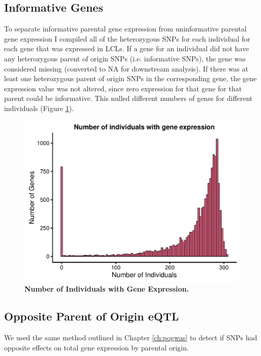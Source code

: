 \subsection{Informative Genes}\label{Informative Genes}
To separate informative parental gene expression from uninformative parental gene expression I compiled all of the heterozygous SNPs for each individual for each gene that was expressed in LCLs. If a gene for an individual did not have any heterozygous parent of origin SNPs (i.e. informative SNPs), the gene was considered missing (converted to NA for downstream analysis). If there was at least one heterozygous parent of origin SNPs in the corresponding gene, the gene expression value was not altered, since zero expression for that gene for that parent could be informative. This nulled different numbers of genes for different individuals (Figure \ref{fig:indspergene}).

\begin{figure}[!htb]
\centering \includegraphics[width=5in]{img/ch04/fig-08-individualspergene.pdf}
\caption[Number of Individuals with Gene Expression.]{\textbf{Number of Individuals with Gene Expression.} }
\label{fig:indspergene}
\end{figure}



\subsection{Opposite Parent of Origin eQTL}\label{Opposite Parent of Origin eQTL}
We used the same method outlined in Chapter \ref{ch:pogwas} to detect if SNPs had opposite effects on total gene expression by parental origin. 

